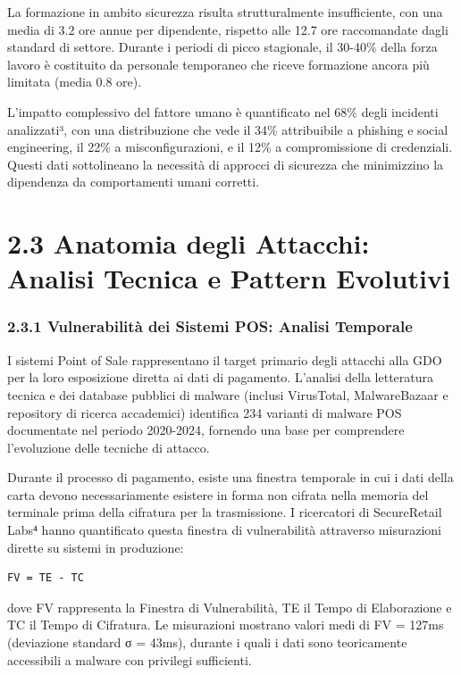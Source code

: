 \documentclass{report}
\begin{document}
La formazione in ambito sicurezza risulta strutturalmente insufficiente,
con una media di 3.2 ore annue per dipendente, rispetto alle 12.7 ore
raccomandate dagli standard di settore. Durante i periodi di picco
stagionale, il 30-40\% della forza lavoro è costituito da personale
temporaneo che riceve formazione ancora più limitata (media 0.8 ore).

L'impatto complessivo del fattore umano è quantificato nel 68\% degli
incidenti analizzati³, con una distribuzione che vede il 34\%
attribuibile a phishing e social engineering, il 22\% a
misconfigurazioni, e il 12\% a compromissione di credenziali. Questi
dati sottolineano la necessità di approcci di sicurezza che minimizzino
la dipendenza da comportamenti umani corretti.

\section{2.3 Anatomia degli Attacchi: Analisi Tecnica e Pattern
Evolutivi}\label{anatomia-degli-attacchi-analisi-tecnica-e-pattern-evolutivi}

\subsubsection{2.3.1 Vulnerabilità dei Sistemi POS: Analisi
Temporale}\label{vulnerabilituxe0-dei-sistemi-pos-analisi-temporale}

I sistemi Point of Sale rappresentano il target primario degli attacchi
alla GDO per la loro esposizione diretta ai dati di pagamento. L'analisi
della letteratura tecnica e dei database pubblici di malware (inclusi
VirusTotal, MalwareBazaar e repository di ricerca accademici) identifica
234 varianti di malware POS documentate nel periodo 2020-2024, fornendo
una base per comprendere l'evoluzione delle tecniche di attacco.

Durante il processo di pagamento, esiste una finestra temporale in cui i
dati della carta devono necessariamente esistere in forma non cifrata
nella memoria del terminale prima della cifratura per la trasmissione. I
ricercatori di SecureRetail Labs⁴ hanno quantificato questa finestra di
vulnerabilità attraverso misurazioni dirette su sistemi in produzione:

\begin{verbatim}
FV = TE - TC
\end{verbatim}

dove FV rappresenta la Finestra di Vulnerabilità, TE il Tempo di
Elaborazione e TC il Tempo di Cifratura. Le misurazioni mostrano valori
medi di FV = 127ms (deviazione standard σ = 43ms), durante i quali i
dati sono teoricamente accessibili a malware con privilegi sufficienti.
\end{document}
